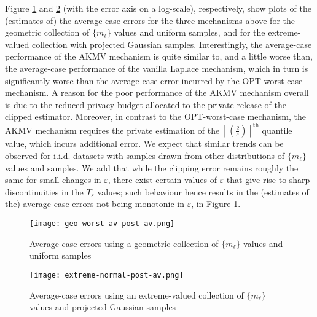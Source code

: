 Figure \ref{fig:avg-geo} and \ref{fig:avg-extreme-normal} (with the error axis on a log-scale), respectively, show plots of the (estimates of) the average-case errors for the three mechanisms above for the geometric collection of $\{m_\ell\}$ values and uniform samples, and for the extreme-valued collection with projected Gaussian samples. Interestingly, the average-case performance of the AKMV mechanism is quite similar to, and a little worse than, the average-case performance of the vanilla Laplace mechanism, which in turn is significantly worse than the average-case error incurred by the OPT-worst-case mechanism. A reason for the poor performance of the AKMV mechanism overall is due to the reduced privacy budget allocated to the private release of the clipped estimator. Moreover, in contrast to the OPT-worst-case mechanism, the AKMV mechanism requires the private estimation of the $\left \lceil \left(\frac{2}{\varepsilon}\right)\right \rceil^{\text{th}}$ quantile value, which incurs additional error. We expect that similar trends can be observed for i.i.d. datasets with samples drawn from other distributions of $\{m_\ell\}$ values and samples. We add that while the clipping error remains roughly the same for small changes in $\varepsilon$, there exist certain values of $\varepsilon$ that give rise to sharp discontinuities in the $T_\varepsilon$ values; such behaviour hence results in the (estimates of the) average-case errors not being monotonic in $\varepsilon$, in Figure \ref{fig:avg-geo}.

\begin{figure}[!t]
	\centering
	\texttt{[image: geo-worst-av-post-av.png]}
	\caption{Average-case errors using a geometric collection of $\{m_\ell\}$ values and uniform samples}
	\label{fig:avg-geo}
\end{figure}
%

\begin{figure}[!t]
	\centering
	\texttt{[image: extreme-normal-post-av.png]}
	\caption{Average-case errors using an extreme-valued collection of $\{m_\ell\}$ values and projected Gaussian samples}
	\label{fig:avg-extreme-normal}
\end{figure}